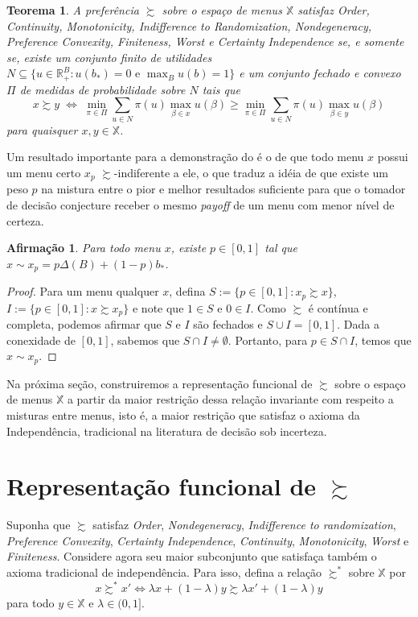 \documentclass[11pt, a4paper]{article}
\theoremstyle{nonumberplain}
\newtheorem{proof}{Dem.}
\theoremstyle{plain}
\newtheorem{theorem}{Teorema}
\theoremstyle{plain}
\newtheorem{claim}{Afirmação}
\theoremstyle{plain}
\begin{document}
\begin{theorem} \label{nossoteorema} A preferência $\succsim$ sobre o espaço de menus $\mathbb{X}$ satisfaz \emph{Order}, \emph{Continuity}, \emph{Monotonicity}, \emph{Indifference to Randomization}, \emph{Nondegeneracy}, \emph{Preference Convexity}, \emph{Finiteness}, \emph{Worst} e \emph{Certainty Independence} se, e somente se, existe um conjunto finito de utilidades $N\subseteq \{u \in \mathbb{R}^B_+:u(b_*)=0\text { e }\max_{B}u(b)=1\}$ e um conjunto fechado e convexo $\Pi$ de medidas de probabilidade sobre $N$ tais que 
\[x \succsim y \;\Leftrightarrow\; \min_{\pi\in\Pi}\sum_{u\in N} \pi(u)\max_{\beta\in x}u(\beta)\geq \min_{\pi\in\Pi}\sum_{u\in N} \pi(u)\max_{\beta\in y}u(\beta)\]
para quaisquer $x,y\in\mathbb{X}$.
\end{theorem} 

Um resultado importante para a demonstração do  é o de que todo menu $x$ possui um menu certo $x_p$ $\succsim$-indiferente a ele, o que traduz a idéia de que existe um peso $p$ na mistura entre o pior e melhor resultados suficiente para que o tomador de decisão conjecture receber o mesmo \emph{payoff} de um menu com menor nível de certeza. 

\begin{claim}Para todo menu $x$, existe $p\in[0,1]$ tal que $x\sim x_p=p\Delta(B)+(1-p)b_*$. \end{claim}
\begin{proof}
Para um menu qualquer $x$, defina $S:=\{p\in[0,1] : x_p\succsim x\}$, $I:=\{p\in[0,1] : x\succsim x_p\}$ e note que $1\in S$ e $0\in I$. Como $\succsim$ é contínua e completa, podemos afirmar que $S$ e $I$ são fechados e $S\cup I=[0,1]$. Dada a conexidade de $[0,1]$, sabemos que $S\cap I\neq \emptyset$. Portanto, para $p\in S\cap I$, temos que $x\sim x_p$.   
\end{proof}

Na próxima seção, construiremos a representação funcional de $\succsim$ sobre o espaço de menus $\mathbb{X}$ a partir da maior restrição dessa relação invariante com respeito a misturas entre menus, isto é, a maior restrição que satisfaz o axioma da Independência, tradicional na literatura de decisão sob incerteza. 

\section{Representação funcional de $\succsim$}

Suponha que $\succsim$ satisfaz \textit{Order}, \textit{Nondegeneracy}, \textit{Indifference to randomization}, \textit{Preference Convexity}, \textit{Certainty Independence}, \textit{Continuity}, \textit{Monotonicity}, \textit{Worst} e \textit{Finiteness}. Considere agora seu maior subconjunto que satisfaça também o axioma tradicional de independência. Para isso, defina a relação $\succsim^*$ sobre $\mathbb{X}$ por $$x\succsim^* x' \Leftrightarrow \lambda x + (1-\lambda)y \succsim \lambda x' + (1-\lambda)y$$ para todo $y\in \mathbb{X}$ e $\lambda\in(0,1]$.
\end{document}
